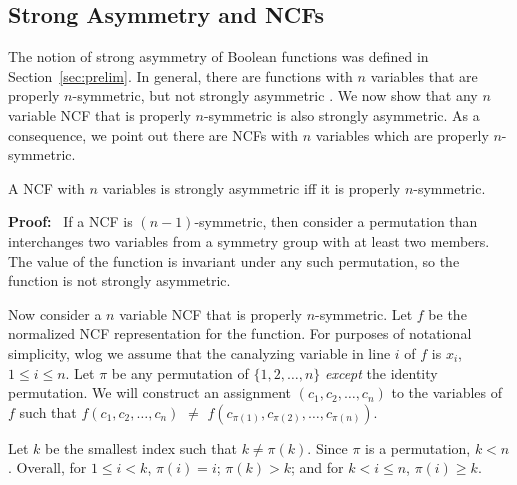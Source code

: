 \subsection{Strong Asymmetry and NCFs}
\label{sse:strong_asym_ncf}

\iffalse
Generalized forms of symmetry have been considered \cite{KS-2000}
in which a Boolean function is symmetric with respect to some permutation,
which can be more general than the permutations corresponding to symmetry groups.
We say that a Boolean function $f(x_1, x_2, \ldots, x_n)$ 
is \textbf{strongly asymmetric}
if for any permutation $\pi$ of $\{1, 2, \ldots, n\}$
\emph{except} the identity permutation,
there exists an input $(a_1, a_2, \ldots,  a_n)$ 
to $f$ such that $f(a_1, a_2, \ldots, a_n)$ $\neq$  
$f(a_{\pi(1)}, a_{\pi(2)}, \ldots, a_{\pi(n)})$.
\fi

The notion of strong asymmetry of Boolean functions was defined 
in Section~\ref{sec:prelim}.
In general, there are functions with $n$ variables that are properly
$n$-symmetric, but not strongly asymmetric \cite{KS-2000}.
We now show that any $n$ variable NCF that is properly $n$-symmetric
is also strongly asymmetric.
As a consequence, we point out there are NCFs with $n$ variables
which are properly $n$-symmetric.

\begin{theorem}\label{thm:ncf_strong_asymmetry}
A NCF with $n$ variables is strongly asymmetric iff
it is properly $n$-symmetric.
\end{theorem}

\noindent
\textbf{Proof:}~ 
If a NCF is $(n-1)$-symmetric, then consider a permutation than
interchanges two variables from a symmetry group with at least two
members.  The value of the function is invariant under any such
permutation, so the function is not strongly asymmetric.

Now consider a $n$ variable NCF that is properly $n$-symmetric.
Let $f$ be the normalized NCF representation for the function.  For
purposes of notational simplicity, wlog we assume that the canalyzing
variable in line $i$ of $f$ is $x_i$, $1 \leq i \leq n$.  Let $\pi$
be any permutation of $\{1, 2, \ldots, n\}$ \emph{except} the
identity permutation.  We will construct an assignment $(c_1, c_2,
\ldots,  c_n)$ to the variables of $f$ such that $f(c_1, c_2, \ldots,
c_n)$ $\neq$ $f(c_{\pi(1)}, c_{\pi(2)}, \ldots, c_{\pi(n)})$.

Let $k$ be the smallest index such that $k \neq \pi(k)$.  Since
$\pi$ is a permutation, $k < n$.  Overall, for $1 \leq i < k$,
$\pi(i) = i$;
 $\pi(k) > k$; and for $k < i \leq n$, $\pi(i) \geq k$.

